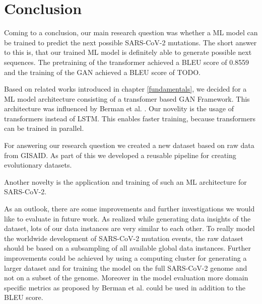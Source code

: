 \section{Conclusion} \label{conclusion}

Coming to a conclusion, our main research question was whether a \ac{ML} model can be trained to predict the next possible \ac{SARS-CoV-2} mutations.
The short answer to this is, that our trained \ac{ML} model is definitely able to generate possible next sequences. The pretraining of the transformer achieved a BLEU score of 0.8559 and the training of the \ac{GAN} achieved a BLEU score of TODO.

Based on related works introduced in chapter \ref{fundamentals}, we decided for a \ac{ML} model architecture consisting of a transfomer based \ac{GAN} Framework. This architecture was influenced by Berman et al. \cite{Berman2020}. Our novelity is the usage of transformers instead of \ac{LSTM}. This enables faster training, because transformers can be trained in parallel. 

For answering our research question we created a new dataset based on raw data from \ac{GISAID}. As part of this we developed a reusable pipeline for creating evolutionary datasets.

Another novelty is the application and training of such an \ac{ML} architecture for \ac{SARS-CoV-2}.


\vspace{0.5cm}

As an outlook, there are some improvements and further investigations we would like to evaluate in future work. As realized while generating data insights of the dataset, lots of our data instances are very similar to each other. To really model the worldwide development of \ac{SARS-CoV-2} mutation events, the raw dataset should be based on a subsampling of all available global data instances. Further improvements could be achieved by using a computing cluster for generating a larger dataset and for training the model on the full \ac{SARS-CoV-2} genome and not on a subset of the genome. Moreover in the model evaluation more domain specific metrics as proposed by Berman et al. \cite{Berman2020} could be used in addition to the BLEU score.
